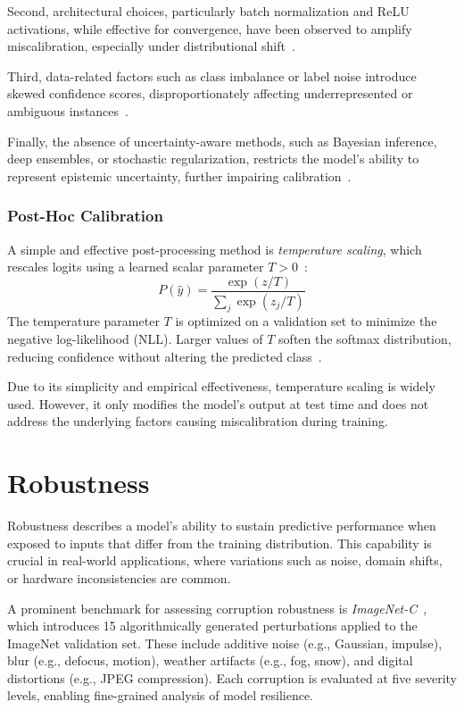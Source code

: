Second, architectural choices, particularly batch normalization and ReLU activations, while effective for convergence, have been observed to amplify miscalibration, especially under distributional shift~\cite{ovadia2019can}.

Third, data-related factors such as class imbalance or label noise introduce skewed confidence scores, disproportionately affecting underrepresented or ambiguous instances~\cite{thulasidasan2019mixup}.

Finally, the absence of uncertainty-aware methods, such as Bayesian inference, deep ensembles, or stochastic regularization, restricts the model's ability to represent epistemic uncertainty, further impairing calibration~\cite{lakshminarayanan2017simple}.

\subsubsection{Post-Hoc Calibration}
A simple and effective post-processing method is \textit{temperature scaling}, which rescales logits using a learned scalar parameter $T > 0$~\cite{calibration1}:
\begin{equation}
P(\hat{y}) = \frac{\exp(z / T)}{\sum_j \exp(z_j / T)}  
\end{equation}
The temperature parameter $T$ is optimized on a validation set to minimize the negative log-likelihood (NLL). Larger values of $T$ soften the softmax distribution, reducing confidence without altering the predicted class~\cite{guo2017calibration}.

Due to its simplicity and empirical effectiveness, temperature scaling is widely used. However, it only modifies the model’s output at test time and does not address the underlying factors causing miscalibration during training.

\section{Robustness}
Robustness describes a model's ability to sustain predictive performance when exposed to inputs that differ from the training distribution. This capability is crucial in real-world applications, where variations such as noise, domain shifts, or hardware inconsistencies are common. 

A prominent benchmark for assessing corruption robustness is \textit{ImageNet-C}~\cite{hendrycks2019benchmarking}, which introduces 15 algorithmically generated perturbations applied to the ImageNet validation set. These include additive noise (e.g., Gaussian, impulse), blur (e.g., defocus, motion), weather artifacts (e.g., fog, snow), and digital distortions (e.g., JPEG compression). Each corruption is evaluated at five severity levels, enabling fine-grained analysis of model resilience.

